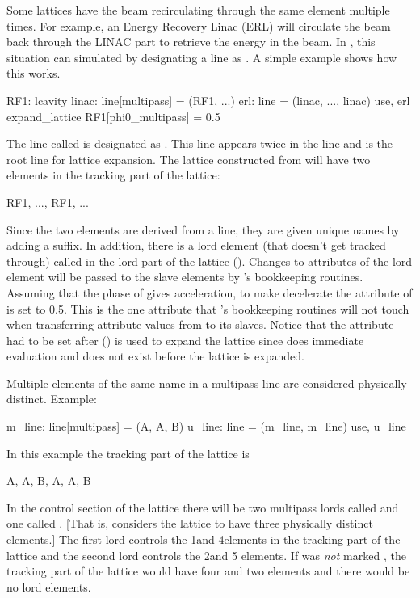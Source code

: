 Some lattices have the beam recirculating through the same element
multiple times. For example, an Energy Recovery Linac (ERL) will
circulate the beam back through the LINAC part to retrieve the energy
in the beam. In \bmad, this situation can simulated by designating a line
as . A simple example shows how this
works.
\begin{example}
  RF1: lcavity
  linac: line[multipass] = (RF1, ...)
  erl: line = (linac, ..., linac)
  use, erl
  expand_lattice
  RF1[phi0_multipass] = 0.5
\end{example}
The line called  is designated as . This
 line appears twice in the line  and  is the
root line for lattice expansion. The lattice constructed from 
will have two  elements in the tracking part of the lattice:
\begin{example}
  RF1, ..., RF1, ...
\end{example}
Since the two elements are derived from a  line, they
are given unique names by adding a  suffix. In addition,
there is a lord element (that doesn't get tracked through) called
 in the lord part of the lattice ().
Changes to attributes of the lord  element will be passed to
the slave elements by \bmad's bookkeeping routines. Assuming that the
phase of  gives acceleration, to make 
decelerate the  attribute of  is set to
0.5. This is the one attribute that \bmad's bookkeeping routines will
not touch when transferring attribute values from  to its
slaves. Notice that the  attribute had to be set
after  () is used to expand the
lattice since \bmad does immediate evaluation and  does not
exist before the lattice is expanded.

Multiple elements of the same name in a multipass line are considered 
physically distinct. Example:
\begin{example}
  m_line: line[multipass] = (A, A, B)
  u_line: line = (m_line, m_line)
  use, u_line
\end{example}
In this example the tracking part of the lattice is
\begin{example}
  A, A, B, A, A, B
\end{example}
In the control section of the lattice there will be two multipass
lords called  and one called . [That is, \bmad considers
the lattice to have three physically distinct elements.] The first
 lord controls the 1\St and 4\Th elements in the tracking part
of the lattice and the second  lord controls the 2\Nd and 5\Th
elements. If  was {\em not} marked , the
tracking part of the lattice would have four  and two 
elements and there would be no lord elements.

